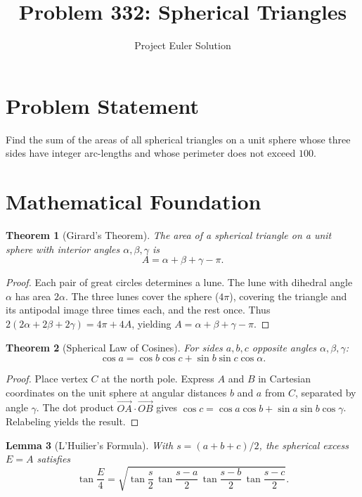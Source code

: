 \documentclass[12pt]{article}
\title{Problem 332: Spherical Triangles}
\author{Project Euler Solution}
\date{}
\newtheorem{theorem}{Theorem}
\newtheorem{lemma}[theorem]{Lemma}
\begin{document}
\maketitle

\section{Problem Statement}

Find the sum of the areas of all spherical triangles on a unit sphere whose three sides have integer arc-lengths and whose perimeter does not exceed $100$.

\section{Mathematical Foundation}

\begin{theorem}[Girard's Theorem]
The area of a spherical triangle on a unit sphere with interior angles $\alpha, \beta, \gamma$ is
\[
A = \alpha + \beta + \gamma - \pi.
\]
\end{theorem}

\begin{proof}
Each pair of great circles determines a lune. The lune with dihedral angle $\alpha$ has area $2\alpha$. The three lunes cover the sphere ($4\pi$), covering the triangle and its antipodal image three times each, and the rest once. Thus $2(2\alpha + 2\beta + 2\gamma) = 4\pi + 4A$, yielding $A = \alpha + \beta + \gamma - \pi$.
\end{proof}

\begin{theorem}[Spherical Law of Cosines]
For sides $a, b, c$ opposite angles $\alpha, \beta, \gamma$:
\[
\cos a = \cos b \cos c + \sin b \sin c \cos \alpha.
\]
\end{theorem}

\begin{proof}
Place vertex $C$ at the north pole. Express $A$ and $B$ in Cartesian coordinates on the unit sphere at angular distances $b$ and $a$ from $C$, separated by angle $\gamma$. The dot product $\vec{OA} \cdot \vec{OB}$ gives $\cos c = \cos a \cos b + \sin a \sin b \cos \gamma$. Relabeling yields the result.
\end{proof}

\begin{lemma}[L'Huilier's Formula]
With $s = (a+b+c)/2$, the spherical excess $E = A$ satisfies
\[
\tan\frac{E}{4} = \sqrt{\tan\frac{s}{2}\,\tan\frac{s-a}{2}\,\tan\frac{s-b}{2}\,\tan\frac{s-c}{2}}.
\]
\end{lemma}
\end{document}
